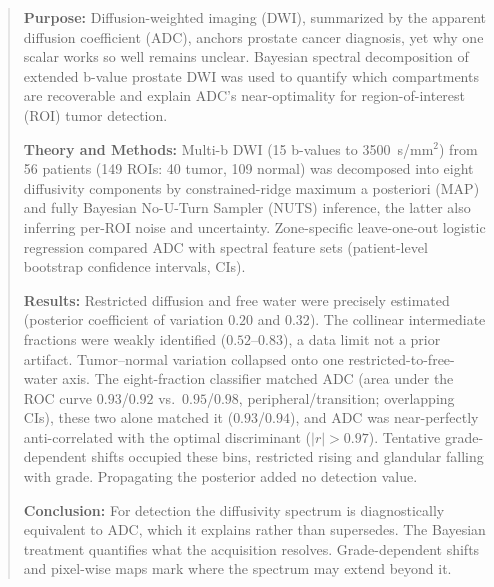 \begin{abstract}

\noindent\textbf{Purpose:}
Diffusion-weighted imaging (DWI), summarized by the apparent diffusion coefficient (ADC), anchors prostate cancer diagnosis, yet why one scalar works so well remains unclear. Bayesian spectral decomposition of extended b-value prostate DWI was used to quantify which compartments are recoverable and explain ADC's near-optimality for region-of-interest (ROI) tumor detection.

\noindent\textbf{Theory and Methods:}
Multi-b DWI (15 b-values to 3500~s/mm$^2$) from 56 patients (149 ROIs: 40 tumor, 109 normal) was decomposed into eight diffusivity components by constrained-ridge maximum a posteriori (MAP) and fully Bayesian No-U-Turn Sampler (NUTS) inference, the latter also inferring per-ROI noise and uncertainty. Zone-specific leave-one-out logistic regression compared ADC with spectral feature sets (patient-level bootstrap confidence intervals, CIs).

\noindent\textbf{Results:}
Restricted diffusion and free water were precisely estimated (posterior coefficient of variation $0.20$ and $0.32$). The collinear intermediate fractions were weakly identified ($0.52$--$0.83$), a data limit not a prior artifact. Tumor--normal variation collapsed onto one restricted-to-free-water axis. The eight-fraction classifier matched ADC (area under the ROC curve $0.93$/$0.92$ vs.\ $0.95$/$0.98$, peripheral/transition; overlapping CIs), these two alone matched it ($0.93$/$0.94$), and ADC was near-perfectly anti-correlated with the optimal discriminant ($|r| > 0.97$). Tentative grade-dependent shifts occupied these bins, restricted rising and glandular falling with grade. Propagating the posterior added no detection value.

\noindent\textbf{Conclusion:}
For detection the diffusivity spectrum is diagnostically equivalent to ADC, which it explains rather than supersedes. The Bayesian treatment quantifies what the acquisition resolves. Grade-dependent shifts and pixel-wise maps mark where the spectrum may extend beyond it.

\end{abstract}
